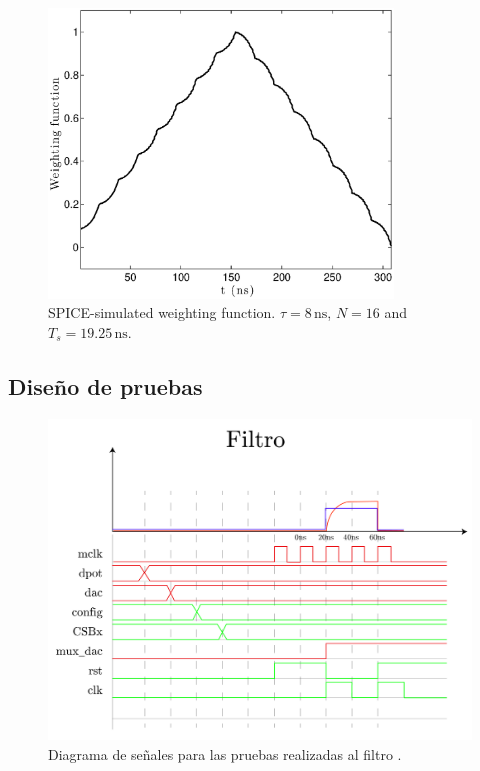 \documentclass[11pt,letterpaper,spanish]{article}
\begin{document}
\begin{figure}[!t]
	\centering
	\includegraphics[width=3.6in]{./figuras/sim_wf}
	\caption{SPICE-simulated weighting function. $\tau=8\,\text{ns}$, $N=16$ and $T_s=19.25\,\text{ns}$.}\label{fig:sim_wf}
\end{figure}

\subsection{Diseño de pruebas}

\begin{figure}[!t]
	\centering
	\includegraphics[width=1\textwidth]{./figuras/tiempos_filtro.png}
	\caption{Diagrama de señales para las pruebas realizadas al filtro .}\label{fig:diagramafiltro}
\end{figure}
\end{document}
